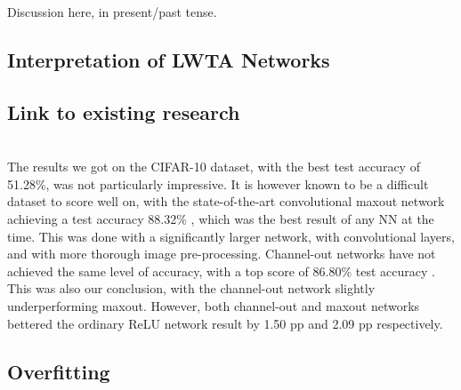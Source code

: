 Discussion here, in present/past tense.

\subsection{Interpretation of LWTA Networks}


\subsection{Link to existing research}
     \\
    The results we got on the CIFAR-10 dataset, with the best test accuracy of 51.28\%, was not particularly impressive. It is however known to be a difficult dataset to score well on, with the state-of-the-art convolutional maxout network achieving a test accuracy 88.32\% \citep{Maxout_Networks}, which was the best result of any NN at the time. This was done with a significantly larger network, with convolutional layers, and with more thorough image pre-processing. Channel-out networks have not achieved the same level of accuracy, with a top score of 86.80\% test accuracy \citep{Wang}. This was also our conclusion, with the channel-out network slightly underperforming maxout. However, both channel-out and maxout networks bettered the ordinary ReLU network result by 1.50 pp and 2.09 pp respectively.



\subsection{Overfitting}
     \\



